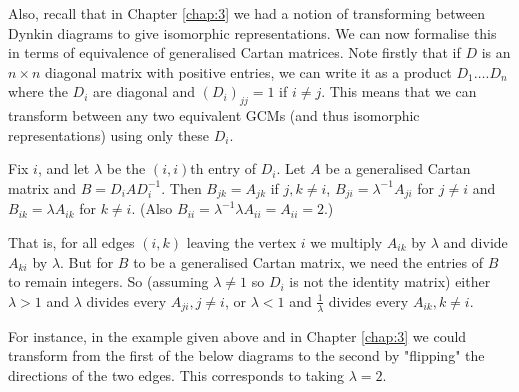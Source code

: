 \documentclass[11pt,a4paper]{report}
\theoremstyle{definition}
\begin{document}
 \begin{figure}[h!]
\centering
{}
\end{figure}
\pagebreak
Also, recall that in Chapter \ref{chap:3} we had a notion of transforming between Dynkin diagrams to give isomorphic representations. We can now formalise this in terms of equivalence of generalised Cartan matrices. Note firstly that if $D$ is an $n \times n$ diagonal matrix with positive entries, we can write it as a product $D_1 \ldots. D_n$ where the $D_i$ are diagonal and $(D_i)_{jj} = 1$ if $i \neq j$. This means that we can transform between any two equivalent GCMs (and thus isomorphic representations) using only these $D_i$. 

Fix $i$, and let $\lambda$ be the $(i, i)$th entry of $D_i$. Let $A$ be a generalised Cartan matrix and $B = D_i A D_i^{-1}$. Then $B_{jk} = A_{jk}$ if $j, k \neq i$, $B_{ji} = \lambda^{-1} A_{ji}$ for $j \neq i$ and $B_{ik} = \lambda A_{ik}$ for $k \neq i$. (Also $B_{ii} = \lambda^{-1} \lambda A_{ii} = A_{ii} = 2$.) 

That is, for all edges $(i, k)$ leaving the vertex $i$ we multiply $A_{ik}$ by $\lambda$ and divide $A_{ki}$ by $\lambda$. But for $B$ to be a generalised Cartan matrix, we need the entries of $B$ to remain integers. So (assuming $\lambda \neq 1$ so $D_i$ is not the identity matrix) either $\lambda > 1$ and $\lambda$ divides every $A_{ji}, j \neq i$, or $\lambda < 1$ and $\frac{1}{\lambda}$ divides every $A_{ik}, k \neq i$. 

For instance, in the example given above and in Chapter \ref{chap:3} we could transform from the first of the below diagrams to the second by "flipping" the directions of the two edges. This corresponds to taking $\lambda = 2$. 

\begin{figure}[h]
\centering
{}
\end{figure}
\end{document}
